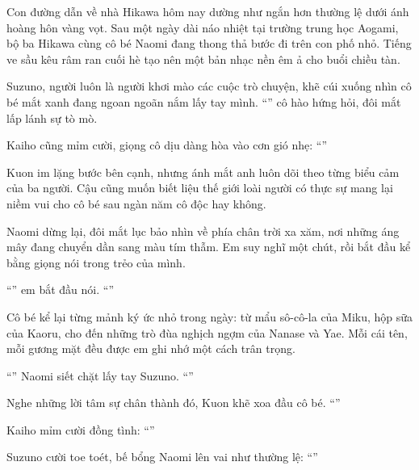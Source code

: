 \documentclass[../main.tex]{subfiles}
\begin{document}
Con đường dẫn về nhà Hikawa hôm nay dường như ngắn hơn thường lệ dưới ánh hoàng hôn vàng vọt. Sau một ngày dài náo nhiệt tại trường trung học Aogami, bộ ba Hikawa cùng cô bé Naomi đang thong thả bước đi trên con phố nhỏ. Tiếng ve sầu kêu râm ran cuối hè tạo nên một bản nhạc nền êm ả cho buổi chiều tàn.

Suzuno, người luôn là người khơi mào các cuộc trò chuyện, khẽ cúi xuống nhìn cô bé mắt xanh đang ngoan ngoãn nắm lấy tay mình. ``'' cô hào hứng hỏi, đôi mắt lấp lánh sự tò mò.

Kaiho cũng mỉm cười, giọng cô dịu dàng hòa vào cơn gió nhẹ: ``''

Kuon im lặng bước bên cạnh, nhưng ánh mắt anh luôn dõi theo từng biểu cảm của ba người. Cậu cũng muốn biết liệu thế giới loài người có thực sự mang lại niềm vui cho cô bé sau ngàn năm cô độc hay không.

Naomi dừng lại, đôi mắt lục bảo nhìn về phía chân trời xa xăm, nơi những áng mây đang chuyển dần sang màu tím thẫm. Em suy nghĩ một chút, rồi bắt đầu kể bằng giọng nói trong trẻo của mình.

``'' em bắt đầu nói. ``''

Cô bé kể lại từng mảnh ký ức nhỏ trong ngày: từ mẩu sô-cô-la của Miku, hộp sữa của Kaoru, cho đến những trò đùa nghịch ngợm của Nanase và Yae. Mỗi cái tên, mỗi gương mặt đều được em ghi nhớ một cách trân trọng.

``'' Naomi siết chặt lấy tay Suzuno. ``''

Nghe những lời tâm sự chân thành đó, Kuon khẽ xoa đầu cô bé. ``''

Kaiho mỉm cười đồng tình: ``''

Suzuno cười toe toét, bế bổng Naomi lên vai như thường lệ: ``''
\end{document}
